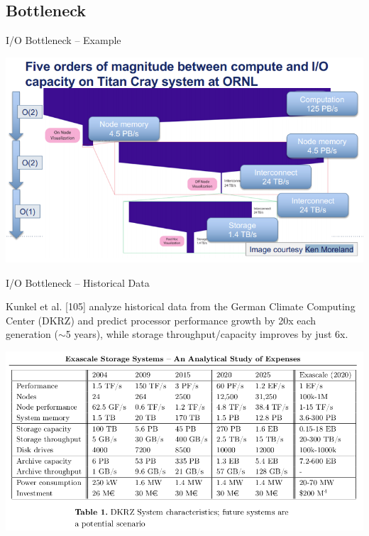 \documentclass[compress,11pt,xcolor=svgnames,aspectratio=169]{beamer}
\begin{document}
\subsection{Bottleneck}

\begin{frame}[t]{I/O Bottleneck -- Example}

\begin{center}
\includegraphics[scale=0.5]{fig/bottleneck-titan}
\end{center}

\end{frame}

\begin{frame}[t]{I/O Bottleneck -- Historical Data}

Kunkel et al. [105] analyze historical data from the German Climate Computing Center (DKRZ) and predict processor performance growth by 20x each generation ($\sim$5 years), while storage throughput/capacity improves by just 6x.

\begin{center}
\includegraphics[scale=0.4]{fig/bottleneck-dkrz}
\end{center}

\end{frame}
\end{document}
